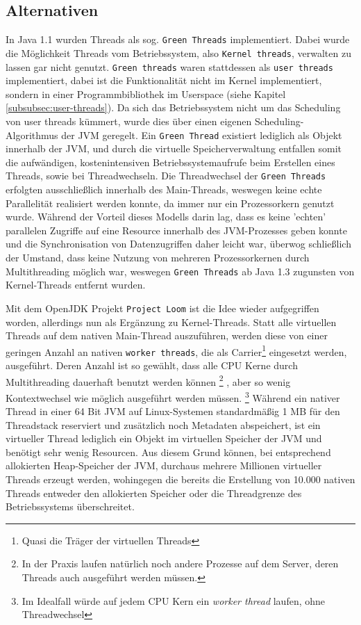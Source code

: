 \subsection{Alternativen}
\label{subsec:alternativen}
In Java 1.1 wurden Threads als sog. \verb|Green Threads| implementiert.
Dabei wurde die Möglichkeit Threads vom Betriebssystem, also \verb|Kernel threads|,
verwalten zu lassen gar nicht genutzt.
\verb|Green threads| waren stattdessen als \verb|user threads| implementiert,
dabei ist die Funktionalität
nicht im Kernel implementiert, sondern in einer Programmbibliothek im Userspace (siehe Kapitel \ref{subsubsec:user-threads}).
Da sich das Betriebssystem nicht um das Scheduling von user threads kümmert, wurde dies über einen eigenen
Scheduling-Algorithmus der JVM geregelt.\parencite{Oracle2010}
Ein \verb|Green Thread| existiert lediglich als Objekt innerhalb der JVM, und durch die virtuelle Speicherverwaltung entfallen
somit die aufwändigen, kostenintensiven Betriebssystemaufrufe beim
Erstellen eines Threads, sowie bei Threadwechseln.
Die Threadwechsel der \verb|Green Threads| erfolgten ausschließlich innerhalb des Main-Threads, weswegen keine echte Parallelität
realisiert werden konnte, da immer nur ein Prozessorkern genutzt wurde.
Während der Vorteil dieses Modells darin lag, dass es keine 'echten' parallelen Zugriffe auf eine Resource innerhalb des JVM-Prozesses geben konnte
und die Synchronisation von Datenzugriffen daher leicht war, überwog schließlich der Umstand, dass keine Nutzung von mehreren Prozessorkernen
durch Multithreading möglich war, weswegen \verb|Green Threads| ab Java 1.3 zugunsten von Kernel-Threads entfernt wurden.

Mit dem OpenJDK Projekt \verb|Project Loom| ist die Idee
wieder aufgegriffen worden, allerdings nun als Ergänzung zu Kernel-Threads.
Statt alle virtuellen Threads auf dem nativen Main-Thread auszuführen, werden diese von einer geringen Anzahl an
nativen \verb|worker threads|, die als Carrier\footnote{Quasi die Träger der virtuellen Threads} eingesetzt werden, ausgeführt.
Deren Anzahl ist so gewählt, dass alle CPU Kerne durch Multithreading dauerhaft benutzt werden können
\footnote{In der Praxis laufen natürlich noch andere Prozesse auf dem Server, deren Threads auch ausgeführt werden müssen.}
, aber so wenig Kontextwechsel wie möglich ausgeführt werden müssen.\parencite{Oracle2021}
\footnote{Im Idealfall würde auf jedem CPU Kern ein \textit{worker thread} laufen, ohne Threadwechsel}
Während ein nativer Thread in einer 64 Bit JVM auf Linux-Systemen standardmäßig 1 MB für den Threadstack reserviert
und zusätzlich noch Metadaten abspeichert, ist ein virtueller Thread
lediglich ein Objekt im virtuellen Speicher der JVM und benötigt sehr wenig Resourcen.
Aus diesem Grund können, bei entsprechend allokierten Heap-Speicher der JVM, durchaus mehrere Millionen virtueller Threads erzeugt werden, wohingegen
die bereits die Erstellung von 10.000 nativen Threads entweder den allokierten Speicher oder die Threadgrenze
des Betriebssystems überschreitet.

